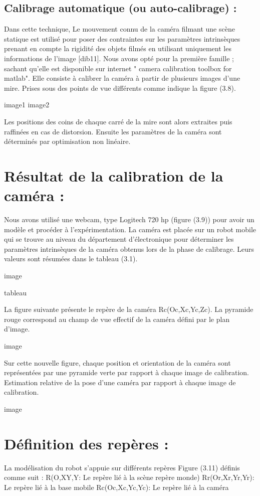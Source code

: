 \subsection{Calibrage automatique (ou auto-calibrage) :}
Dans cette technique, Le mouvement connu de la caméra filmant une scène statique est 
utilisé pour poser des contraintes sur les paramètres intrinsèques prenant en compte la rigidité 
des objets filmés en utilisant uniquement les informations de l’image [dib11].
Nous avons opté pour la première famille ; sachant qu'elle est disponible sur internet " 
camera calibration toolbox for matlab". Elle consiste à calibrer la caméra à partir de 
plusieurs images d'une mire. Prises sous des points de vue différents comme indique la figure
(3.8).

image1
image2

Les positions des coins de chaque carré de la mire sont alors extraites puis raffinées en 
cas de distorsion. Ensuite les paramètres de la caméra sont déterminés par optimisation non 
linéaire.
\section{Résultat de la calibration de la caméra :}
Nous avons utilisé une webcam, type Logitech 720 hp (figure (3.9)) pour avoir un 
modèle et procéder à l'expérimentation. La caméra est placée sur un robot mobile qui se 
trouve au niveau du département d'électronique pour déterminer les paramètres intrinsèques 
de la caméra obtenus lors de la phase de calibrage. Leurs valeurs sont résumées dans le 
tableau (3.1).

image

tableau

La figure suivante présente le repère de la caméra Rc(Oc,Xc,Yc,Zc). La pyramide 
rouge correspond au champ de vue effectif de la caméra défini par le plan d'image.

image

Sur cette nouvelle figure, chaque position et orientation de la caméra sont représentées
par une pyramide verte par rapport à chaque image de calibration.
Estimation relative de la pose d'une caméra par rapport à chaque image de 
calibration.

image 

\section{ Définition des repères : }
La modélisation du robot s'appuie sur différents repères Figure (3.11) définis comme suit :
R(O,XY,Y: Le repère lié à la scène repère monde)
Rr(Or,Xr,Yr,Yr): Le repère lié à la base mobile
Rc(Oc,Xc,Yc,Yc): Le repère lié à la caméra

